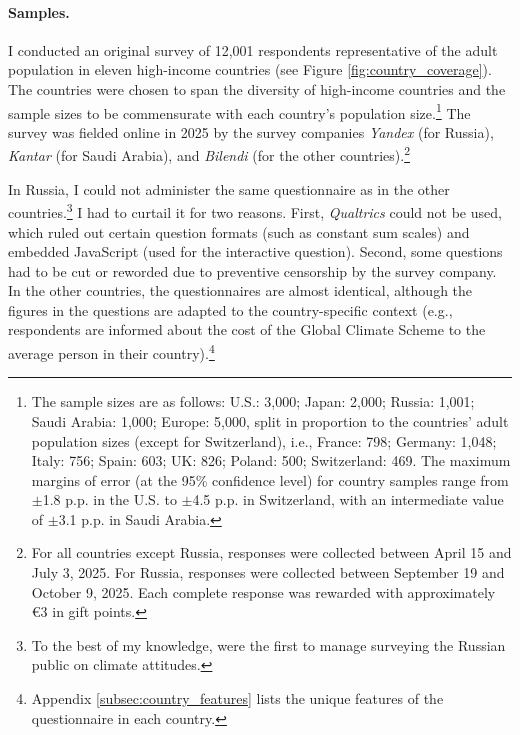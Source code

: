 \documentclass[12pt,english]{article}
\begin{document}
\paragraph{Samples.}
I conducted an original survey of 12,001 respondents representative of the adult population in eleven high-income countries (see Figure \ref{fig:country_coverage}). The countries were chosen to span the diversity of high-income countries and the sample sizes to be commensurate with each country's population size.\footnote{The sample sizes are as follows: U.S.: 3,000; Japan: 2,000; Russia: 1,001; Saudi Arabia: 1,000; Europe: 5,000, split in proportion to the countries' adult population sizes (except for Switzerland), i.e., France: 798; Germany: 1,048; Italy: 756; Spain: 603; UK: 826; Poland: 500; Switzerland: 469. The maximum margins of error (at the 95\% confidence level) for country samples range from $\pm$1.8 p.p. in the U.S. to $\pm$4.5 p.p. in Switzerland, with an intermediate value of $\pm$3.1 p.p. in Saudi Arabia. } 
The survey was fielded online in 2025 by the survey companies \textit{Yandex} (for Russia), \textit{Kantar} (for Saudi Arabia), and \textit{Bilendi} (for the other countries).\footnote{For all countries except Russia, responses were collected between April 15 and July 3, 2025. For Russia, responses were collected between September 19 and October 9, 2025. Each complete response was rewarded with approximately \euro{}3 in gift points.} 

In Russia, I could not administer the same questionnaire as in the other countries.\footnote{To the best of my knowledge, \cite{toews_learning_2025} were the first to manage surveying the Russian public on climate attitudes.} I had to curtail it for two reasons. First, \textit{Qualtrics} could not be used, which ruled out certain question formats (such as constant sum scales) and embedded JavaScript (used for the interactive question). Second, some questions had to be cut or reworded due to preventive censorship by the survey company. In the other countries, the questionnaires are almost identical, although the figures in the questions are adapted to the country-specific context (e.g., respondents are informed about the cost of the Global Climate Scheme to the average person in their country).\footnote{Appendix \ref{subsec:country_features} lists the unique features of the questionnaire in each country.}
\end{document}
